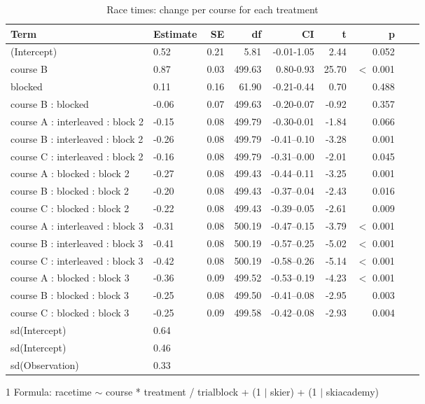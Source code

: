 {\begin{table}[ht]
\centering
\begin{threeparttable}
\caption{Race times: change per course for each treatment}\label{paper1: racetimechangepercourse}
\begin{tabular}{llrrrrrrl}
  \hline
Term & Estimate & SE & df & CI & t & p \\ 
  \hline
(Intercept) & 0.52 & 0.21 & 5.81 & -0.01-1.05 & 2.44 &    0.052 \\ 
course B & 0.87 & 0.03 & 499.63 & 0.80-0.93 & 25.70 &  $<$  0.001 \\ 
blocked & 0.11 & 0.16 & 61.90 & -0.21-0.44 & 0.70 &    0.488 \\ 
course B : blocked & -0.06 & 0.07 & 499.63 & -0.20-0.07 & -0.92 &    0.357 \\ 
course A : interleaved : block 2 & -0.15 & 0.08 & 499.79 & -0.30-0.01 & -1.84 &    0.066 \\ 
course B : interleaved : block 2 & -0.26 & 0.08 & 499.79 & -0.41--0.10 & -3.28 &    0.001 \\ 
course C : interleaved : block 2 & -0.16 & 0.08 & 499.79 & -0.31--0.00 & -2.01 &    0.045 \\ 
course A : blocked : block 2 & -0.27 & 0.08 & 499.43 & -0.44--0.11 & -3.25 &    0.001 \\ 
course B : blocked : block 2 & -0.20 & 0.08 & 499.43 & -0.37--0.04 & -2.43 &    0.016 \\ 
course C : blocked : block 2 & -0.22 & 0.08 & 499.43 & -0.39--0.05 & -2.61 &    0.009 \\ 
course A : interleaved : block 3 & -0.31 & 0.08 & 500.19 & -0.47--0.15 & -3.79 &  $<$  0.001 \\ 
course B : interleaved : block 3 & -0.41 & 0.08 & 500.19 & -0.57--0.25 & -5.02 &  $<$  0.001 \\ 
course C : interleaved : block 3 & -0.42 & 0.08 & 500.19 & -0.58--0.26 & -5.14 &  $<$  0.001 \\ 
course A : blocked : block 3 & -0.36 & 0.09 & 499.52 & -0.53--0.19 & -4.23 &  $<$  0.001 \\ 
course B : blocked : block 3 & -0.25 & 0.08 & 499.50 & -0.41--0.08 & -2.95 &    0.003 \\ 
course C : blocked : block 3 & -0.25 & 0.09 & 499.58 & -0.42--0.08 & -2.93 &    0.004 \\ 
sd(Intercept) & 0.64 &  &  &  &  &  \\ 
sd(Intercept) & 0.46 &  &  &  &  &   \\ 
sd(Observation) & 0.33 &  &  &  &  &  \\ 
   \hline
\end{tabular}
\begin{tablenotes}
\item[1] Formula: racetime $\sim$ course * treatment / trialblock + (1 $|$ skier) + (1 $|$ skiacademy)
\end{tablenotes}
\end{threeparttable}
\end{table}


}
